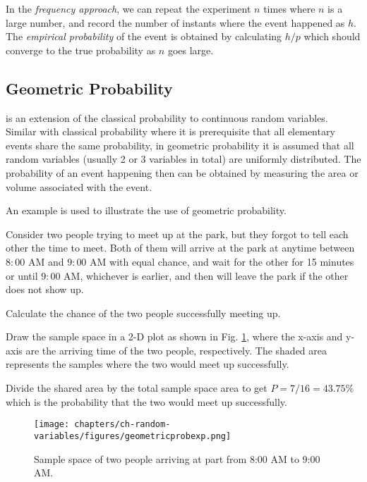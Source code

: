 In the \textit{frequency approach}, we can repeat the experiment $n$ times where $n$ is a large number, and record the number of instants where the event happened as $h$. The \textit{empirical probability} of the event is obtained by calculating $h/p$ which should converge to the true probability as $n$ goes large.

\subsection{Geometric Probability}

 is an extension of the classical probability to continuous random variables. Similar with classical probability where it is prerequisite that all elementary events share the same probability, in geometric probability it is assumed that all random variables (usually 2 or 3 variables in total) are uniformly distributed. The probability of an event happening then can be obtained by measuring the area or volume associated with the event.

An example is used to illustrate the use of geometric probability.

\begin{shortbox}
Consider two people trying to meet up at the park, but they forgot to tell each other the time to meet. Both of them will arrive at the park at anytime between $8:00$ AM and $9:00$ AM with equal chance, and wait for the other for 15 minutes or until $9:00$ AM, whichever is earlier, and then will leave the park if the other does not show up.

Calculate the chance of the two people successfully meeting up.

Draw the sample space in a 2-D plot as shown in Fig. \ref{fig:geometricprobexp}, where the x-axis and y-axis are the arriving time of the two people, respectively. The shaded area represents the samples where the two would meet up successfully.

Divide the shared area by the total sample space area to get $P=7/16=43.75\%$ which is the probability that the two would meet up successfully.
\end{shortbox}

\begin{figure}
	\centering
	\texttt{[image: chapters/ch-random-variables/figures/geometricprobexp.png]}
	\caption{Sample space of two people arriving at part from 8:00 AM to 9:00 AM.} \label{fig:geometricprobexp}
\end{figure}

